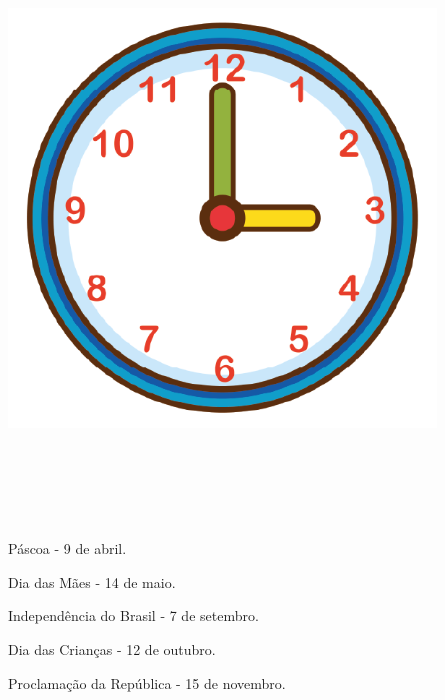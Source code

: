 \includegraphics[width=4.46875in,height=6.30882in]{media/image60.png}

\begin{escolha}
\item  Páscoa - 9 de abril.


\item  Dia das Mães - 14 de maio.


\item  Independência do Brasil - 7 de setembro.


\item  Dia das Crianças - 12 de outubro.


\item  Proclamação da República - 15 de novembro.

\end{escolha}

